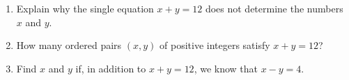 \begin{enumerate}
\item[(a)] Explain why the single equation $x+y=12$ does not determine the numbers $x$ and $y$.
\item[(b)] How many ordered pairs $(x,y)$ of positive integers satisfy $x+y=12$?
\item[(c)] Find $x$ and $y$ if, in addition to $x+y=12$, we know that $x-y=4$.
\end{enumerate}
